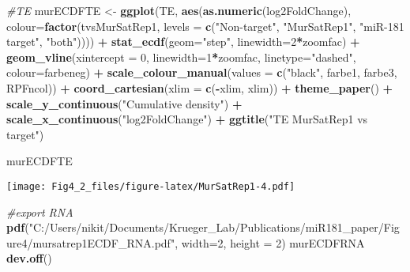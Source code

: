 \documentclass[
]{article}
\newenvironment{Shaded}{\begin{snugshade}}{\end{snugshade}}
\newcommand{\AttributeTok}[1]{\textcolor[rgb]{0.13,0.29,0.53}{#1}}
\newcommand{\CommentTok}[1]{\textcolor[rgb]{0.56,0.35,0.01}{\textit{#1}}}
\newcommand{\DecValTok}[1]{\textcolor[rgb]{0.00,0.00,0.81}{#1}}
\newcommand{\FunctionTok}[1]{\textcolor[rgb]{0.13,0.29,0.53}{\textbf{#1}}}
\newcommand{\NormalTok}[1]{#1}
\newcommand{\OtherTok}[1]{\textcolor[rgb]{0.56,0.35,0.01}{#1}}
\newcommand{\SpecialCharTok}[1]{\textcolor[rgb]{0.81,0.36,0.00}{\textbf{#1}}}
\newcommand{\StringTok}[1]{\textcolor[rgb]{0.31,0.60,0.02}{#1}}
\begin{document}
\begin{Shaded}
\begin{Highlighting}[]
\CommentTok{\#TE}
\NormalTok{murECDFTE }\OtherTok{\textless{}{-}} \FunctionTok{ggplot}\NormalTok{(TE, }\FunctionTok{aes}\NormalTok{(}\FunctionTok{as.numeric}\NormalTok{(log2FoldChange), }\AttributeTok{colour=}\FunctionTok{factor}\NormalTok{(tvsMurSatRep1, }\AttributeTok{levels =} \FunctionTok{c}\NormalTok{(}\StringTok{"Non{-}target"}\NormalTok{, }\StringTok{"MurSatRep1"}\NormalTok{, }\StringTok{"miR{-}181 target"}\NormalTok{, }\StringTok{"both"}\NormalTok{)))) }\SpecialCharTok{+} 
  \FunctionTok{stat\_ecdf}\NormalTok{(}\AttributeTok{geom=}\StringTok{"step"}\NormalTok{, }\AttributeTok{linewidth=}\DecValTok{2}\SpecialCharTok{*}\NormalTok{zoomfac) }\SpecialCharTok{+}
  \FunctionTok{geom\_vline}\NormalTok{(}\AttributeTok{xintercept =} \DecValTok{0}\NormalTok{, }\AttributeTok{linewidth=}\DecValTok{1}\SpecialCharTok{*}\NormalTok{zoomfac, }\AttributeTok{linetype=}\StringTok{"dashed"}\NormalTok{, }\AttributeTok{colour=}\NormalTok{farbeneg) }\SpecialCharTok{+}
  \FunctionTok{scale\_colour\_manual}\NormalTok{(}\AttributeTok{values =} \FunctionTok{c}\NormalTok{(}\StringTok{"black"}\NormalTok{, farbe1, farbe3, RPFncol)) }\SpecialCharTok{+}
  \FunctionTok{coord\_cartesian}\NormalTok{(}\AttributeTok{xlim =} \FunctionTok{c}\NormalTok{(}\SpecialCharTok{{-}}\NormalTok{xlim, xlim)) }\SpecialCharTok{+} 
  \FunctionTok{theme\_paper}\NormalTok{() }\SpecialCharTok{+}
  \FunctionTok{scale\_y\_continuous}\NormalTok{(}\StringTok{"Cumulative density"}\NormalTok{) }\SpecialCharTok{+} \FunctionTok{scale\_x\_continuous}\NormalTok{(}\StringTok{"log2FoldChange"}\NormalTok{) }\SpecialCharTok{+}
  \FunctionTok{ggtitle}\NormalTok{(}\StringTok{"TE MurSatRep1 vs target"}\NormalTok{)}

\NormalTok{murECDFTE}
\end{Highlighting}
\end{Shaded}

\texttt{[image: Fig4\_2\_files/figure-latex/MurSatRep1-4.pdf]}

\begin{Shaded}
\begin{Highlighting}[]
\CommentTok{\#export RNA}
\FunctionTok{pdf}\NormalTok{(}\StringTok{"C:/Users/nikit/Documents/Krueger\_Lab/Publications/miR181\_paper/Figure4/mursatrep1ECDF\_RNA.pdf"}\NormalTok{, }\AttributeTok{width=}\DecValTok{2}\NormalTok{, }\AttributeTok{height =} \DecValTok{2}\NormalTok{)}
\NormalTok{murECDFRNA}
\FunctionTok{dev.off}\NormalTok{()}
\end{Highlighting}
\end{Shaded}
\end{document}
